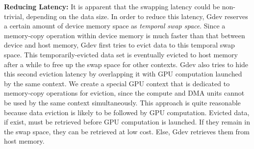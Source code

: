 \textbf{Reducing Latency:}
It is apparent that the swapping latency could be non-trivial, depending
on the data size.
In order to reduce this latency, Gdev reserves a certain amount of
device memory space as \textit{temporal swap space}.
Since a memory-copy operation within device memory is much faster than
that between device and host memory, Gdev first tries to evict data to
this temporal swap space.
This temporarily-evicted data set is eventually evicted to host memory
after a while to free up the swap space for other contexts. 
Gdev also tries to hide this second eviction latency by overlapping it
with GPU computation launched by the same context.
We create a special GPU context that is dedicated to memory-copy
operations for eviction, since the compute and DMA units cannot be used
by the same context simultaneously.
This approach is quite reasonable because data eviction is likely to be
followed by GPU computation.
Evicted data, if exist, must be retrieved before GPU computation is
launched. 
If they remain in the swap space, they can be retrieved at low cost.
Else, Gdev retrieves them from host memory.
